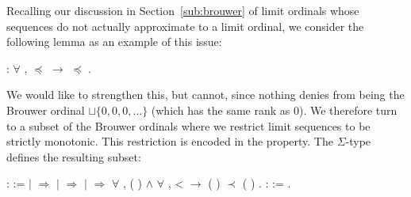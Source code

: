 Recalling our discussion in Section~\ref{sub:brouwer} of limit ordinals whose
sequences do not actually approximate to a limit ordinal, we consider the
following lemma as an example of this issue:
\begin{singlespace}
\begin{coqdoccode}
\coqdocnoindent
{}
:
\ensuremath{\forall} \coqdocvar{\ensuremath{\alpha}} \coqdocvar{\ensuremath{\beta}},
\coqdocvariable{\ensuremath{\alpha}} \ensuremath{\preceq}
\ensuremath{\rightarrow}
\coqdocvariable{\ensuremath{\alpha}} \ensuremath{\preceq}
\coqdocvariable{\ensuremath{\beta}}.\coqdoceol
\end{coqdoccode}
\end{singlespace}
We would like to strengthen this, but cannot, since nothing denies \coqdocvariable{\ensuremath{\alpha}}
from being the Brouwer ordinal $\sqcup \{ 0, 0, 0, \ldots \}$ (which has the
same rank as $0$). We therefore turn to a subset of the Brouwer ordinals where
we restrict limit sequences to be strictly monotonic. This restriction is
encoded in the  property. The
$\Sigma$-type 
defines the resulting subset:
\begin{singlespace}
\begin{coqdoccode}
\coqdocnoindent
{} 
\coqdocvar{\ensuremath{\alpha}} :  :=\coqdoceol
\coqdocindent{1.00em}
 \coqdocvariable{\ensuremath{\alpha}} \coqdoceol
\coqdocindent{1.00em}
\ensuremath{|} 
\ensuremath{\Rightarrow}
\coqdoceol
\coqdocindent{1.00em}
\ensuremath{|} 
\coqdocvar{\ensuremath{\beta}} \ensuremath{\Rightarrow}
 \coqdocvariable{\ensuremath{\beta}}\coqdoceol
\coqdocindent{1.00em}
\ensuremath{|}  
\ensuremath{\Rightarrow} \ensuremath{\forall} ,
 (
) \ensuremath{\land} \ensuremath{\forall} ,
 <  \ensuremath{\rightarrow}
( ) \ensuremath{\prec}
( )\coqdoceol
\coqdocindent{1.00em}
.\coqdoceol
\coqdocemptyline
\coqdocnoindent
{}
 : 
:=
.\coqdoceol
\end{coqdoccode}
\end{singlespace}

